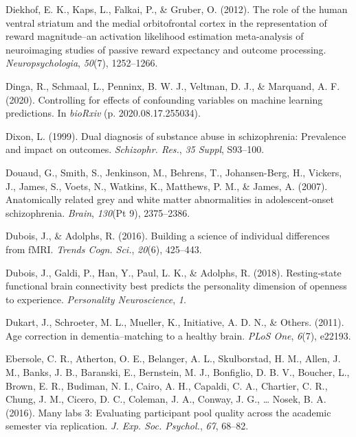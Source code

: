\documentclass[12pt,american,a4paper,oneside,]{memoir} %
\begin{document}
\leavevmode\hypertarget{ref-diekhof2012role}{}%
Diekhof, E. K., Kaps, L., Falkai, P., \& Gruber, O. (2012). The role of the human ventral striatum and the medial orbitofrontal cortex in the representation of reward magnitude--an activation likelihood estimation meta-analysis of neuroimaging studies of passive reward expectancy and outcome processing. \emph{Neuropsychologia}, \emph{50}(7), 1252--1266.

\leavevmode\hypertarget{ref-Dinga2020-si}{}%
Dinga, R., Schmaal, L., Penninx, B. W. J., Veltman, D. J., \& Marquand, A. F. (2020). Controlling for effects of confounding variables on machine learning predictions. In \emph{bioRxiv} (p. 2020.08.17.255034).

\leavevmode\hypertarget{ref-Dixon1999-kl}{}%
Dixon, L. (1999). Dual diagnosis of substance abuse in schizophrenia: Prevalence and impact on outcomes. \emph{Schizophr. Res.}, \emph{35 Suppl}, S93--100.

\leavevmode\hypertarget{ref-Douaud2007-sw}{}%
Douaud, G., Smith, S., Jenkinson, M., Behrens, T., Johansen-Berg, H., Vickers, J., James, S., Voets, N., Watkins, K., Matthews, P. M., \& James, A. (2007). Anatomically related grey and white matter abnormalities in adolescent-onset schizophrenia. \emph{Brain}, \emph{130}(Pt 9), 2375--2386.

\leavevmode\hypertarget{ref-Dubois2016-zz}{}%
Dubois, J., \& Adolphs, R. (2016). Building a science of individual differences from fMRI. \emph{Trends Cogn. Sci.}, \emph{20}(6), 425--443.

\leavevmode\hypertarget{ref-dubois2018resting}{}%
Dubois, J., Galdi, P., Han, Y., Paul, L. K., \& Adolphs, R. (2018). Resting-state functional brain connectivity best predicts the personality dimension of openness to experience. \emph{Personality Neuroscience}, \emph{1}.

\leavevmode\hypertarget{ref-Dukart2011-aq}{}%
Dukart, J., Schroeter, M. L., Mueller, K., Initiative, A. D. N., \& Others. (2011). Age correction in dementia--matching to a healthy brain. \emph{PLoS One}, \emph{6}(7), e22193.

\leavevmode\hypertarget{ref-Ebersole2016-cr}{}%
Ebersole, C. R., Atherton, O. E., Belanger, A. L., Skulborstad, H. M., Allen, J. M., Banks, J. B., Baranski, E., Bernstein, M. J., Bonfiglio, D. B. V., Boucher, L., Brown, E. R., Budiman, N. I., Cairo, A. H., Capaldi, C. A., Chartier, C. R., Chung, J. M., Cicero, D. C., Coleman, J. A., Conway, J. G., \ldots{} Nosek, B. A. (2016). Many labs 3: Evaluating participant pool quality across the academic semester via replication. \emph{J. Exp. Soc. Psychol.}, \emph{67}, 68--82.
\end{document}
